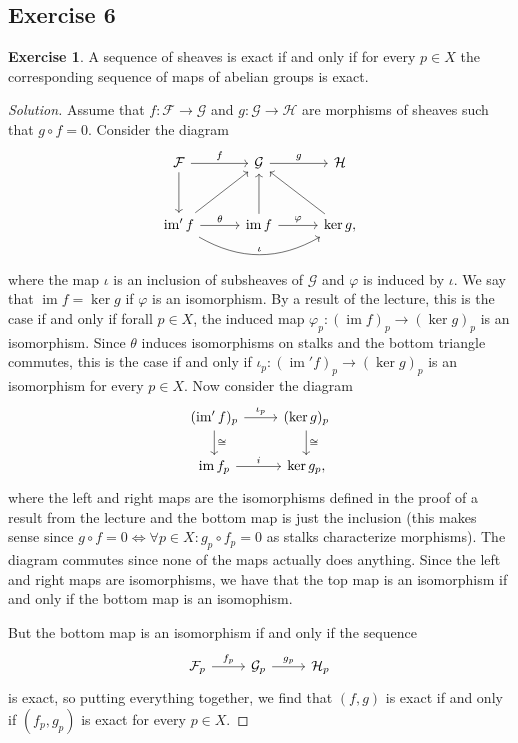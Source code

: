 \documentclass[a4paper]{amsbook}
\theoremstyle{definition}
\newtheorem*{exercise*}{Exercise}
\DeclareMathOperator\im{im}
\begin{document}
\subsection*{Exercise 6}
\label{Ex6}
\begin{exercise*}
\label{Exercise6}
A sequence of sheaves is exact if and only if for every $p \in X$ the corresponding
sequence of maps of abelian groups is exact.
\end{exercise*}
\begin{proof}[Solution]
Assume that $f\colon \mathcal{F}\to \mathcal{G}$ and $g\colon \mathcal{G}\to \mathcal{H}$
are morphisms of sheaves such that $g \circ f = 0$. Consider the diagram
\[\begin{tikzcd}[row sep = 1cm, column sep=1cm]
	\mathcal{F}\ar[r, "f"]\ar[d] & \mathcal{G}\ar[r, "g"] & \mathcal{H}\\
	\im' f\ar[ur]\ar[r, "\theta"]\ar[rr, bend right, "\iota"] &\im f\ar[r, "\varphi"]\ar[u] & \ker g,\ar[ul]
\end{tikzcd}\]
where the map $\iota$ is an inclusion of subsheaves of $\mathcal{G}$ and $\varphi$ is
induced by $\iota$. We say that $\im f = \ker g$ if $\varphi$ is an isomorphism. By
a result of the lecture, this is the case if and only if forall $p \in X$, the
induced map $\varphi_p\colon (\im f)_p \to (\ker g)_p$ is an isomorphism. Since
$\theta$ induces isomorphisms on stalks and the bottom triangle commutes, this is
the case if and only if $\iota_p\colon (\im' f)_p\to (\ker g)_p$ is an isomorphism
for every $p \in X$. Now consider the diagram
\[\begin{tikzcd}
	(\im' f)_p \ar[r, "\iota_p"]\ar[d, "\cong"] & (\ker g)_p\ar[d, "\cong"]\\
	\im f_p\ar[r, "i"] & \ker g_p,
\end{tikzcd}\]
where the left and right maps are the isomorphisms defined in the proof of a result
from the lecture and the bottom map is just the inclusion (this makes sense since
$g \circ f = 0 \iff \forall p \in X\colon g_p \circ f_p = 0$ as stalks characterize morphisms). The
diagram commutes since none of the maps actually does anything. Since the left and
right maps are isomorphisms, we have that the top map is an isomorphism if and only
if the bottom map is an isomophism.

But the bottom map is an isomorphism if and only if the sequence
\[\begin{tikzcd}
	\mathcal{F}_p\ar[r, "f_p"] & \mathcal{G}_p\ar[r, "g_p"] & \mathcal{H}_p
\end{tikzcd}\]
is exact, so putting everything together, we find that $(f, g)$ is exact if and only if
$(f_p, g_p)$ is exact for every $p \in X$.
\end{proof}
\end{document}
